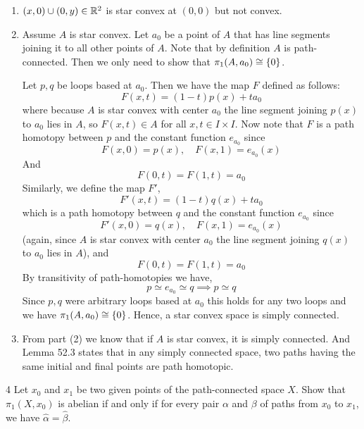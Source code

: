\documentclass[12pt]{article}
\begin{document}
\begin{solution}
    \bbni
    \begin{enumerate}
        \item $(x, 0) \cup (0,y) \in \mathbb R^2$ is star convex at $(0,0)$ but not convex. 
        \item Assume $A$ is star convex. Let $a_0$ be a point of $A$ that has line segments joining it to all other points of $A$. Note that by definition $A$ is path-connected. Then we only need to show that $\pi_1(A, a_0) \cong \{0\}$. 
        
        Let $p, q$ be loops based at $a_0$. Then we have the map $F$ defined as follows: 
        \[F(x,t) = (1-t)p(x) + ta_0\]
        where because $A$ is star convex with center $a_0$ the line segment joining $p(x)$ to $a_0$ lies in $A$, so $F(x,t) \in A$ for all $x,t \in I \times I$. 
        Now note that $F$ is a path homotopy between $p$ and the constant function $e_{a_0}$ since 
        \[F(x, 0) = p(x), \quad F(x, 1) = e_{a_0}(x)\] 
        And 
        \[F(0,t) = F(1,t) = a_0 \]
        Similarly, we define the map $F'$, 
        \[F'(x,t) = (1-t)q(x) + ta_0\]
        which is a path homotopy between $q$ and the constant function $e_{a_0}$ since 
        \[F'(x, 0) = q(x), \quad F(x, 1) = e_{a_0}(x)\] 
        (again, since $A$ is star convex with center $a_0$ the line segment joining $q(x)$ to $a_0$ lies in $A$), and 
        \[F(0,t) = F(1,t) = a_0 \]
        By transitivity of path-homotopies we have, 
        \[p \simeq e_{a_0} \simeq q \implies p \simeq q\]
        Since $p, q$ were arbitrary loops based at $a_0$ this holds for any two loops and we have $\pi_1(A, a_0) \cong \{0\}$. Hence, a star convex space is simply connected.

        \item From part (2) we know that if $A$ is star convex, it is simply connected. And Lemma 52.3 states that in any simply connected space, two paths having the same initial and final points are path homotopic. 
    \end{enumerate}
\end{solution}

\newpage 

\begin{problem}{4}
    Let $x_0$ and $x_1$ be two given points of the path-connected space $X$. Show that $\pi_1(X, x_0)$ is abelian if and only if for every pair $\alpha$ and $\beta$ of paths from $x_0$ to $x_1$, we have $\widehat{\alpha} = \widehat{\beta}$. 
\end{problem}
\end{document}
